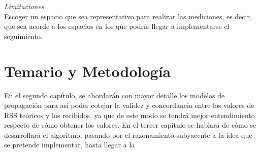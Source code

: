 \textit{Limitaciones}\\

Escoger un espacio que sea representativo para realizar las mediciones, es decir, que sea acorde a los espacios en los que podría llegar a implementarse el seguimiento.\\


\section{Temario y Metodología}

En el segundo capítulo, se abordarán con mayor detalle los modelos de propagación para así poder cotejar la validez y concordancia entre los valores de RSS teóricos y los recibidos, ya que de este modo se tendrá mejor entendimiento respecto de cómo obtener los valores. En el tercer capítulo se hablará de cómo se desarrollará el algoritmo, pasando por el razonamiento subyacente a la idea que se pretende implementar, hasta llegar a la
